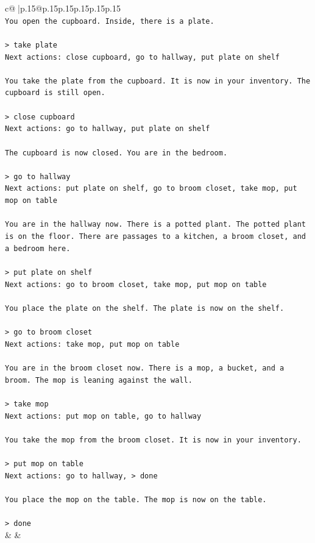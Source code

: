 \documentclass{article}
\begin{document}
{\begin{supertabular}{c@{$\;$}|p{.15\linewidth}@{}p{.15\linewidth}p{.15\linewidth}p{.15\linewidth}p{.15\linewidth}p{.15\linewidth}}
{{{\\ 
\texttt{You open the cupboard. Inside, there is a plate.} \\
\\ 
\texttt{> take plate  } \\
\texttt{Next actions: close cupboard, go to hallway, put plate on shelf} \\
\\ 
\texttt{You take the plate from the cupboard. It is now in your inventory. The cupboard is still open.} \\
\\ 
\texttt{> close cupboard  } \\
\texttt{Next actions: go to hallway, put plate on shelf} \\
\\ 
\texttt{The cupboard is now closed. You are in the bedroom.} \\
\\ 
\texttt{> go to hallway  } \\
\texttt{Next actions: put plate on shelf, go to broom closet, take mop, put mop on table} \\
\\ 
\texttt{You are in the hallway now. There is a potted plant. The potted plant is on the floor. There are passages to a kitchen, a broom closet, and a bedroom here.} \\
\\ 
\texttt{> put plate on shelf  } \\
\texttt{Next actions: go to broom closet, take mop, put mop on table} \\
\\ 
\texttt{You place the plate on the shelf. The plate is now on the shelf.} \\
\\ 
\texttt{> go to broom closet  } \\
\texttt{Next actions: take mop, put mop on table} \\
\\ 
\texttt{You are in the broom closet now. There is a mop, a bucket, and a broom. The mop is leaning against the wall.} \\
\\ 
\texttt{> take mop  } \\
\texttt{Next actions: put mop on table, go to hallway} \\
\\ 
\texttt{You take the mop from the broom closet. It is now in your inventory.} \\
\\ 
\texttt{> put mop on table  } \\
\texttt{Next actions: go to hallway, > done} \\
\\ 
\texttt{You place the mop on the table. The mop is now on the table.} \\
\\ 
\texttt{> done} \\
            }
        }
    }
    & & \\ \\


\end{supertabular}}
\end{document}
